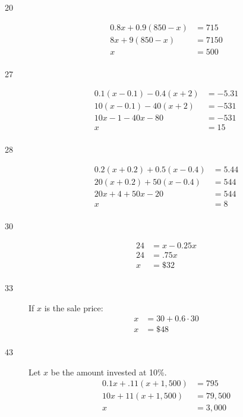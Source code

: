 \documentclass[letterpaper]{exam}
\begin{document}
\begin{description}
      \item[20]
        \begin{align*}
          0.8x + 0.9 (850 - x) & = 715 \\
          8x + 9(850 - x)      & = 7150 \\
          x                    & = \boxed{ 500 } \\
        \end{align*}

      \item[27]
        \begin{align*}
          0.1 (x - 0.1) - 0.4(x + 2) & = -5.31 \\
          10(x - 0.1) - 40(x + 2)    & = -531 \\
          10x - 1 - 40x - 80         & = -531 \\
          x                          & = \boxed{ 15 } \\
        \end{align*}

      \item[28]
        \begin{align*}
          0.2(x + 0.2) + 0.5(x - 0.4) & = 5.44 \\
          20(x + 0.2) + 50(x - 0.4)   & = 544 \\
          20x + 4 + 50x - 20          & = 544 \\
          x                           & = \boxed{ 8 } \\
        \end{align*}

      \item[30]
        \begin{align*}
          24 & = x - 0.25x \\
          24 & = .75x \\
          x  & = \boxed{ \$32 } \\
        \end{align*}

      \item[33] 
        If $x$ is the sale price:
        \begin{align*}
          x & = 30 + 0.6 \cdot 30 \\
          x & = \boxed{ \$48 } \\
        \end{align*}

      \item[43] Let $x$ be the amount invested at 10\%.
        \begin{align*}
          0.1x + .11(x + 1,500) & = 795 \\
          10x + 11(x + 1,500)   & = 79,500 \\
          x                    & = \boxed{ 3,000 } \\
        \end{align*}

      \end{description}
\end{document}
